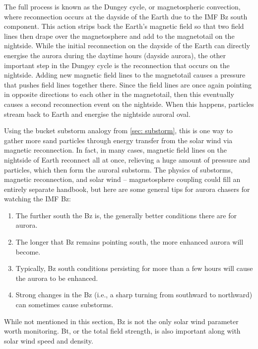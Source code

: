 \documentclass{article}
\begin{document}
The full process is known as the Dungey cycle, or magnetospheric convection, where reconnection occurs at the dayside of the Earth due to the IMF Bz south component. This action strips back the Earth's magnetic field so that two field lines then drape over the magnetosphere and add to the magnetotail on the nightside. While the initial reconnection on the dayside of the Earth can directly energise the aurora during the daytime hours (dayside aurora), the other important step in the Dungey cycle is the reconnection that occurs on the nightside. Adding new magnetic field lines to the magnetotail causes a pressure that pushes field lines together there. Since the field lines are once again pointing in opposite directions to each other in the magnetotail, then this eventually causes a second reconnection event on the nightside. When this happens, particles stream back to Earth and energise the nightside auroral oval.

Using the bucket substorm analogy from \ref{sec: substorm}, this is one way to gather more sand particles through energy transfer from the solar wind via magnetic reconnection. In fact, in many cases, magnetic field lines on the nightside of Earth reconnect all at once, relieving a huge amount of pressure and particles, which then form the auroral substorm.
The physics of substorms, magnetic reconnection, and solar wind -- magnetosphere coupling could fill an entirely separate handbook, but here are some general tips for aurora chasers for watching the IMF Bz:
\begin{enumerate}
    \item The further south the Bz is, the generally better conditions there are for aurora.
    \item The longer that Bz remains pointing south, the more enhanced aurora will become.
    \item Typically, Bz south conditions persisting for more than a few hours will cause the aurora to be enhanced.
    \item Strong changes in the Bz (i.e., a sharp turning from southward to northward) can sometimes cause substorms.
\end{enumerate}

While not mentioned in this section, Bz is not the only solar wind parameter worth monitoring. Bt, or the total field strength, is also important along with solar wind speed and density.
\end{document}
